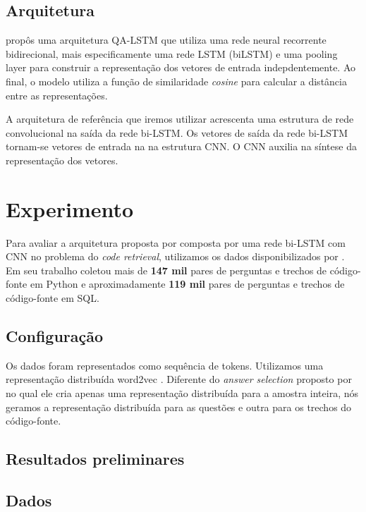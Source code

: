 \documentclass[12pt]{article}
\begin{document}
\subsection{Arquitetura}

\cite{tan-lstm-qa} propôs uma arquitetura QA-LSTM que utiliza uma rede neural recorrente bidirecional, mais especificamente uma rede LSTM (biLSTM) \cite{hochreiter-Schmidhuber-lstm-1997} e uma pooling layer para construir a representação dos vetores de entrada indepdentemente. Ao final, o modelo utiliza a função de similaridade \textit{cosine} para calcular a distância
entre as representações. 

A arquitetura de referência que iremos utilizar acrescenta uma estrutura de rede convolucional na saída da rede bi-LSTM. Os vetores de saída da rede bi-LSTM tornam-se vetores de entrada na na estrutura CNN. O CNN auxilia na síntese da representação dos vetores.

\section{Experimento}

Para avaliar a arquitetura proposta por \cite{tan-lstm-qa} composta por uma rede bi-LSTM com CNN no problema do \textit{code retrieval}, utilizamos os dados disponibilizados por \cite{Yao-staqc:2018}. Em seu trabalho \cite{Yao-staqc:2018} coletou mais de \textbf{147 mil} pares de perguntas e trechos de código-fonte em Python e aproximadamente \textbf{119 mil} pares de perguntas e trechos de código-fonte em SQL. 
\subsection{Configuração}

Os dados foram representados como sequência de tokens. Utilizamos uma representação distribuída word2vec \cite{mikolov-word2vec-2013}. Diferente do \textit{answer selection} proposto por \cite{tan-lstm-qa} no qual ele cria apenas uma representação distribuída para a amostra inteira, nós geramos a representação distribuída para as questões e outra para os trechos do código-fonte.


\subsection{Resultados preliminares}\label{sec:resultados-preliminares}

\subsection{Dados}
\end{document}
